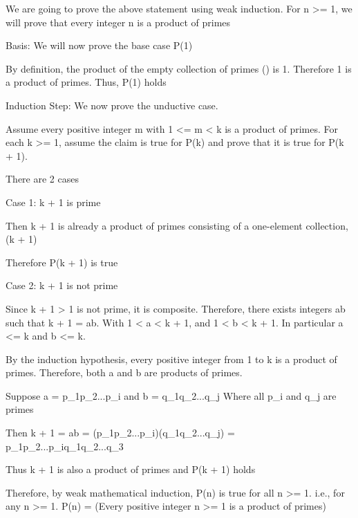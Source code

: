 We are going to prove the above statement using weak induction. For n >= 1, we will prove that every integer n is a product of primes

Basis: We will now prove the base case P(1)

By definition, the product of the empty collection of primes () is 1. Therefore 1 is a product of primes. Thus, P(1) holds

Induction Step: We now prove the unductive case.

Assume every positive integer m with 1 <= m < k is a product of primes.
For each k >= 1, assume the claim is true for P(k) and prove that it is true for P(k + 1).

There are 2 cases

Case 1: k + 1 is prime

Then k + 1 is already a product of primes consisting of a one-element collection, (k + 1)

Therefore P(k + 1) is true

Case 2: k + 1 is not prime

Since k + 1 > 1 is not prime, it is composite. Therefore, there exists integers ab such that k + 1 = ab. With 1 < a < k + 1, and 1 < b < k + 1. In particular a <= k and b <= k.

By the induction hypothesis, every positive integer from 1 to k is a product of primes. Therefore, both a and b are products of primes.

Suppose a = p_1p_2...p_i and b = q_1q_2...q_j
Where all p_i and q_j are primes

Then k + 1 = ab = (p_1p_2...p_i)(q_1q_2...q_j) = p_1p_2...p_iq_1q_2...q_3

Thus k + 1 is also a product of primes and P(k + 1) holds

Therefore, by weak mathematical induction, P(n) is true for all n >= 1. i.e., for any n >= 1.
P(n) = (Every positive integer n >= 1 is a product of primes)
